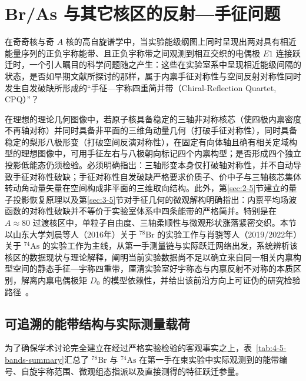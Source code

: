 \section{Br/As 与其它核区的反射---手征问题}\label{sec:4-5}

在奇奇核与奇 $A$ 核的高自旋谱学中，当实验能级纲图上同时呈现出两对具有相近能量序列的正负宇称能带、且正负宇称带之间观测到相互交织的电偶极 $E1$ 连接跃迁时，一个引人瞩目的科学问题随之产生：这些在实验室系中呈现相近能级间隔的状态，是否如早期文献所探讨的那样，属于内禀手征对称性与空间反射对称性同时发生自发破缺所形成的“手征---宇称四重简并带（Chiral-Reflection Quartet, CPQ）”？

在理想的理论几何图像中，若原子核具备稳定的三轴非对称核芯（使四极内禀密度不再轴对称）并同时具备非平面的三维角动量几何（打破手征对称性），同时具备稳定的梨形八极形变（打破空间反演对称性），在固定有向体轴且确有相关定域构型的理想图像中，可用手征左右与八极朝向标记四个内禀构型；是否形成四个独立投影低能态仍须检验。必须明确指出：三轴形变本身仅打破轴对称性，并不自动导致手征对称性破缺；手征对称性自发破缺严格要求价质子、价中子与三轴核芯集体转动角动量矢量在空间构成非平面的三维取向结构。此外，第\ref{sec:2-5}节建立的量子投影恢复原理以及第\ref{sec:3-5}节对手征几何的微观解构明确指出：内禀平均场波函数的对称性破缺并不等价于实验室体系中四条能带的严格简并。特别是在 $A \approx 80$ 过渡核区中，单粒子自由度、三轴柔顺性与微观形状涨落紧密交织。本节以山东大学刘晨等人（2016年）关于 $^{78}\mathrm{Br}$ 的实验工作与肖骁等人（2019/2022年）关于 $^{74}\mathrm{As}$ 的实验工作为主线，从第一手测量链与实际跃迁网络出发，系统辨析该核区的数据现状与理论解释，阐明当前实验数据尚不足以确立来自同一相关内禀构型空间的静态手征---宇称四重带，厘清实验室好宇称态与内禀反射不对称的本质区别，解离内禀电偶极矩 $D_0$ 的模型依赖性，并给出该前沿方向上可证伪的研究检验路径~\cite{liu-2016-octupole-correlations-multiple-chiral-doublet-bands-78br,liu-chen-2016-78br-chirality-reflection-symmetry-thesis,xiao-2022-chirality-octupole-correlations-74as,xiao-xiao-2019-high-spin-74as-thesis,butler-1996-octupole-shapes,wang-2019-rat-prm-78br-octupole-correlations}。

\subsection{可追溯的能带结构与实际测量载荷}\label{sec:4-5-1}

为了确保学术讨论完全建立在经过严格实验检验的客观事实之上，表~\ref{tab:4-5-bands-summary}汇总了 $^{78}\mathrm{Br}$ 与 $^{74}\mathrm{As}$ 在第一手在束实验中实际观测到的能带编号、自旋宇称范围、微观组态指派以及直接测得的特征跃迁参量。

